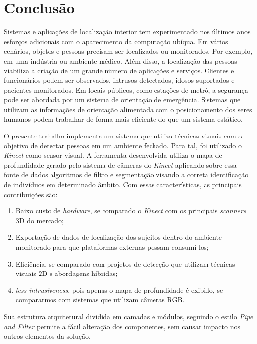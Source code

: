 \section{Conclusão}\label{sec:conclusao}

Sistemas e aplicações de localização interior tem experimentado nos últimos anos esforços adicionais com o aparecimento da computação ubíqua. Em vários cenários, objetos e pessoas precisam ser localizados ou monitorados. Por exemplo, em uma indústria ou ambiente médico. Além disso, a localização das pessoas viabiliza a criação de um grande número de aplicações e serviços. Clientes e funcionários podem ser observados, intrusos detectados, idosos suportados e pacientes monitorados. Em locais públicos, como estações de metrô, a segurança pode ser abordada por um sistema de orientação de emergência. Sistemas que utilizam as informações de orientação alimentada com o posicionamento dos seres humanos podem trabalhar de forma mais eficiente do que um sistema estático. 

O presente trabalho implementa um sistema que utiliza técnicas visuais com o objetivo de detectar pessoas em um ambiente fechado. Para tal, foi utilizado o \textit{Kinect} como sensor visual. A ferramenta desenvolvida utiliza o mapa de profundidade gerado pelo sistema de câmeras do \textit{Kinect} aplicando sobre essa fonte de dados algoritmos de filtro e segmentação visando a correta identificação de indivíduos em determinado âmbito.
Com essas características, as principais contribuições são:

\begin{enumerate}
    \item Baixo custo de \textit{hardware}, se comparado o \textit{Kinect} com os principais \textit{scanners} 3D do mercado;  
    \item Exportação de dados de localização dos sujeitos dentro do ambiente monitorado para que plataformas externas possam consumí-los;
    \item Eficiência, se comparado com projetos de detecção que utilizam técnicas visuais 2D e abordagens híbridas;
    \item \textit{less intrusiveness}, pois apenas o mapa de profundidade é exibido, se compararmos com sistemas que utilizam câmeras RGB. 
\end{enumerate}

Sua estrutura arquitetural dividida em camadas e módulos, seguindo o estilo \textit{Pipe and Filter} permite a fácil alteração dos componentes, sem causar impacto nos outros  elementos da solução. 

